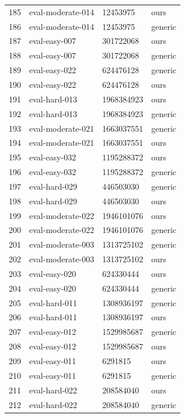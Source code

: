 \begin{tabular}{llll}
185 & eval-moderate-014 & 12453975 & ours \\
186 & eval-moderate-014 & 12453975 & generic \\
187 & eval-easy-007 & 301722068 & ours \\
188 & eval-easy-007 & 301722068 & generic \\
189 & eval-easy-022 & 624476128 & generic \\
190 & eval-easy-022 & 624476128 & ours \\
191 & eval-hard-013 & 1968384923 & ours \\
192 & eval-hard-013 & 1968384923 & generic \\
193 & eval-moderate-021 & 1663037551 & generic \\
194 & eval-moderate-021 & 1663037551 & ours \\
195 & eval-easy-032 & 1195288372 & ours \\
196 & eval-easy-032 & 1195288372 & generic \\
197 & eval-hard-029 & 446503030 & generic \\
198 & eval-hard-029 & 446503030 & ours \\
199 & eval-moderate-022 & 1946101076 & ours \\
200 & eval-moderate-022 & 1946101076 & generic \\
201 & eval-moderate-003 & 1313725102 & generic \\
202 & eval-moderate-003 & 1313725102 & ours \\
203 & eval-easy-020 & 624330444 & ours \\
204 & eval-easy-020 & 624330444 & generic \\
205 & eval-hard-011 & 1308936197 & generic \\
206 & eval-hard-011 & 1308936197 & ours \\
207 & eval-easy-012 & 1529985687 & generic \\
208 & eval-easy-012 & 1529985687 & ours \\
209 & eval-easy-011 & 6291815 & ours \\
210 & eval-easy-011 & 6291815 & generic \\
211 & eval-hard-022 & 208584040 & ours \\
212 & eval-hard-022 & 208584040 & generic \\
\hline
\end{tabular}
